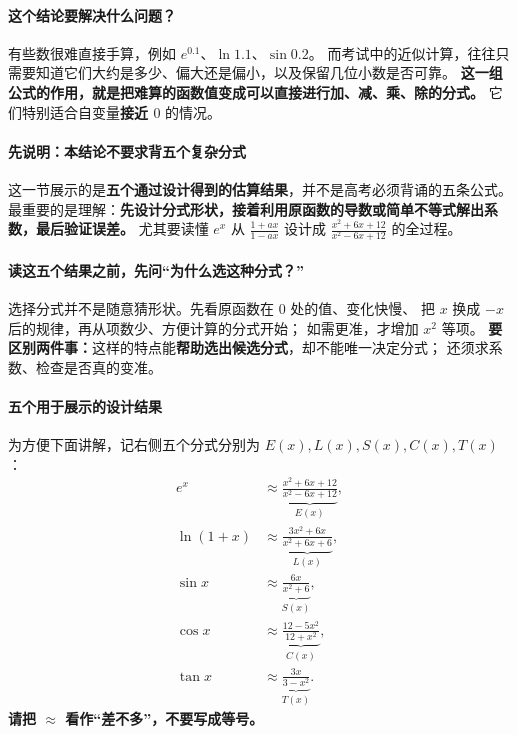 \begin{statementbox}
\paragraph{这个结论要解决什么问题？}
有些数很难直接手算，例如 $e^{0.1}$、$\ln1.1$、$\sin0.2$。
而考试中的近似计算，往往只需要知道它们大约是多少、偏大还是偏小，以及保留几位小数是否可靠。
\textbf{这一组公式的作用，就是把难算的函数值变成可以直接进行加、减、乘、除的分式。}
它们特别适合自变量\textbf{接近 $0$} 的情况。


\begin{center}\end{center}
\end{statementbox}
\clearpage
\begin{statementbox}
\paragraph{先说明：本结论不要求背五个复杂分式}
这一节展示的是\textbf{五个通过设计得到的估算结果}，并不是高考必须背诵的五条公式。
最重要的是理解：\textbf{先设计分式形状，接着利用原函数的导数或简单不等式解出系数，最后验证误差。}
尤其要读懂 $e^x$ 从 $\frac{1+ax}{1-ax}$ 设计成 $\frac{x^2+6x+12}{x^2-6x+12}$ 的全过程。

\paragraph{读这五个结果之前，先问“为什么选这种分式？”}
选择分式并不是随意猜形状。先看原函数在 $0$ 处的值、变化快慢、
把 $x$ 换成 $-x$ 后的规律，再从项数少、方便计算的分式开始；
如需更准，才增加 $x^2$ 等项。
\textbf{要区别两件事：}这样的特点能\textbf{帮助选出候选分式}，却不能唯一决定分式；
还须求系数、检查是否真的变准。
\paragraph{五个用于展示的设计结果}
为方便下面讲解，记右侧五个分式分别为 $E(x),L(x),S(x),C(x),T(x)$：
\[
\begin{aligned}
e^x&\approx\underbrace{\frac{x^2+6x+12}{x^2-6x+12}}_{E(x)},\\[3pt]
\ln(1+x)&\approx\underbrace{\frac{3x^2+6x}{x^2+6x+6}}_{L(x)},\\[3pt]
\sin x&\approx\underbrace{\frac{6x}{x^2+6}}_{S(x)},\\[3pt]
\cos x&\approx\underbrace{\frac{12-5x^2}{12+x^2}}_{C(x)},\\[3pt]
\tan x&\approx\underbrace{\frac{3x}{3-x^2}}_{T(x)}.
\end{aligned}
\]
\textbf{请把 $\approx$ 看作“差不多”，不要写成等号。}


\end{statementbox}
